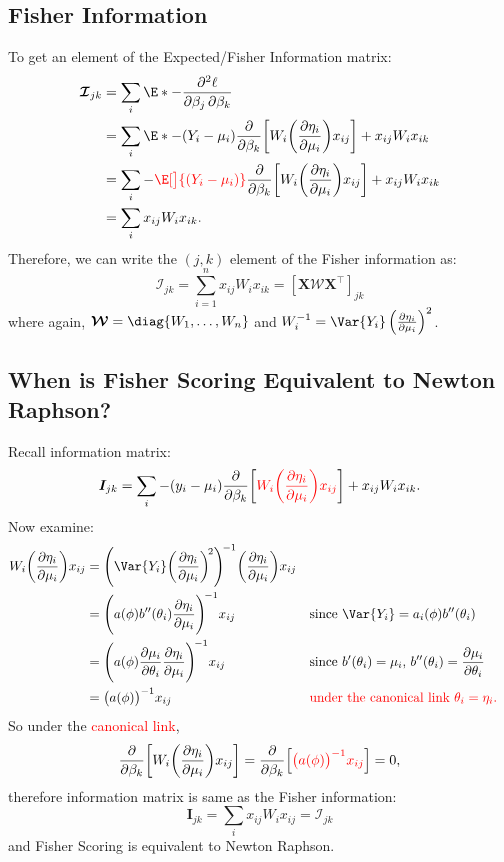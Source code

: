 \documentclass[oneside]{book}\usepackage[]{graphicx}\usepackage[svgnames]{xcolor}
\providecommand{\Matrix}[1]{\bm{#1}}
\providecommand{\MatrixCal}[1]{\bm{\mathcal{#1}}}
\begin{document}
\subsection*{Fisher Information}
To get an element of the Expected/Fisher Information matrix:
\begin{align*}
    \MatrixCal{I}_{jk}
     & =\sum_i\E*{-\pdv{\ell}{\beta_j,\beta_k}}                                                                                                \\
     & =\sum_i\E*{-(Y_i-\mu_i)\pdv*{\biggl[W_i\biggl(\pdv{\eta_i}{\mu_i}\biggr)x_{ij}\biggr]}{\beta_k}+x_{ij}W_i x_{ik}}                       \\
     & =\sum_i-\textcolor{Red}{\E[\big]{(Y_i-\mu_i)}}\pdv*{\biggl[W_i\biggl(\pdv{\eta_i}{\mu_i}\biggr)x_{ij}\biggr]}{\beta_k}+x_{ij}W_i x_{ik} \\
     & =\sum_i x_{ij}W_i x_{ik}.
\end{align*}
Therefore, we can write the $(j, k)$ element of the Fisher information as:
\[ \MatrixCal{I}_{jk}=\sum_{i=1}^{n} x_{ij}W_i x_{ik}=[\Matrix{X}\Matrix{\MatrixCal{W}}\Matrix{X}^\top]_{jk} \]
where again, $ \MatrixCal{W}=\diag{W_1,\ldots,W_n} $ and $ W_i^{-1}=\Var{Y_i}\pdv{\eta_i}{\mu_i}^2 $.
\subsection*{When is Fisher Scoring Equivalent to Newton Raphson?}
Recall information matrix:
\[  \Matrix{I}_{jk}=\sum_i -(y_i-\mu_i)\pdv*{\biggl[\textcolor{Red}{W_i\biggl(\pdv{\eta_i}{\mu_i}\biggr)x_{ij}}\biggr]}{\beta_k}+x_{ij}W_i x_{ik}. \]
Now examine:
\begin{align*}
    W_i\biggl(\pdv{\eta_i}{\mu_i}\biggr)x_{ij}
     & =\Biggl(\Var{Y_i}\biggl(\pdv{\eta_i}{\mu_i}\biggr)^{\!2}\Biggr)^{\!-1}\biggl(\pdv{\eta_i}{\mu_i}\biggr)x_{ij}                                                                                                        \\
     & =\Biggl(a(\phi)b^{\prime\prime}(\theta_i)\pdv{\eta_i}{\mu_i}\Biggr)^{\!-1}x_{ij}                              &  & \text{since $\Var{Y_i}=a_i(\phi)b^{\prime\prime}(\theta_i)$}                                      \\
     & =\Biggl(a(\phi)\pdv{\mu_i}{\theta_i}\pdv{\eta_i}{\mu_i} \Biggr)^{\!-1}x_{ij}                                  &  & \text{since $ b^{\prime}(\theta_i)=\mu_i $, $ b^{\prime\prime}(\theta_i)=\pdv{\mu_i}{\theta_i} $} \\
     & =\bigl(a(\phi)\bigr)^{-1}x_{ij}                                                                               &  & \text{\textcolor{Red}{under the canonical link $\theta_i=\eta_i$.}}
\end{align*}
So under the \textcolor{Red}{canonical link},
\[ \pdv*{\biggl[W_i\biggl(\pdv{\eta_i}{\mu_i}\biggr)x_{ij}\biggr]}{\beta_k}=\pdv*{\Bigl[\textcolor{Red}{\bigl(a(\phi)\bigr)^{-1}x_{ij}}\Bigr]}{\beta_k}=0, \]
therefore information matrix is same as the Fisher information:
\[ \Matrix{I}_{jk}=\sum_{i}x_{ij}W_i x_{ij}=\MatrixCal{I}_{jk}  \]
and Fisher Scoring is equivalent to Newton Raphson.
\end{document}
